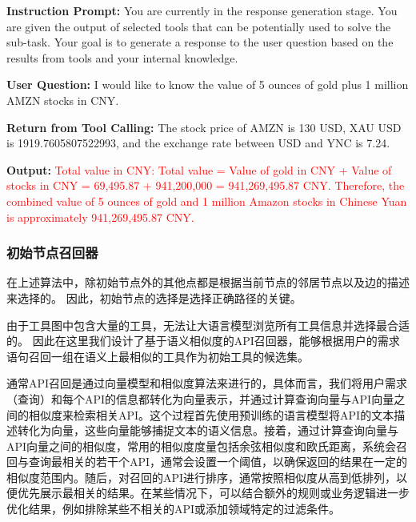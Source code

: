 \begin{center}
\begin{tcolorbox}[colback=bgcolor, colframe=black, width=0.8\textwidth, boxrule=0.5mm, 
coltitle=white, colbacktitle=titlecolor, title=An Example for Response Generation with GPT-4]


\textbf{Instruction Prompt:} You are currently in the response generation stage. You are given the output of selected tools that can be potentially used to solve the sub-task. Your goal is to generate a response to the user question based on the results from tools and your internal knowledge.

\textbf{User Question:} I would like to know the value of 5 ounces of gold plus 1 million AMZN stocks in CNY.

\textbf{Return from Tool Calling:} The stock price of AMZN is 130 USD, XAU USD is 1919.7605807522993, and the exchange rate between USD and YNC is 7.24.

\textbf{Output:} \textcolor{red}{Total value in CNY: Total value = Value of gold in CNY + Value of stocks in CNY = 69,495.87 + 941,200,000 = 941,269,495.87 CNY. Therefore, the combined value of 5 ounces of gold and 1 million Amazon stocks in Chinese Yuan is approximately 941,269,495.87 CNY.}

\end{tcolorbox}

\end{center}

\subsubsection{初始节点召回器}

在上述算法中，除初始节点外的其他点都是根据当前节点的邻居节点以及边的描述来选择的。
因此，初始节点的选择是选择正确路径的关键。

由于工具图中包含大量的工具，无法让大语言模型浏览所有工具信息并选择最合适的。
因此在这里我们设计了基于语义相似度的API召回器，能够根据用户的需求语句召回一组在语义上最相似的工具作为初始工具的候选集。

通常API召回是通过向量模型和相似度算法来进行的，具体而言，我们将用户需求（查询）和每个API的信息都转化为向量表示，并通过计算查询向量与API向量之间的相似度来检索相关API。这个过程首先使用预训练的语言模型将API的文本描述转化为向量，这些向量能够捕捉文本的语义信息。接着，通过计算查询向量与API向量之间的相似度，常用的相似度度量包括余弦相似度和欧氏距离，系统会召回与查询最相关的若干个API，通常会设置一个阈值，以确保返回的结果在一定的相似度范围内。随后，对召回的API进行排序，通常按照相似度从高到低排列，以便优先展示最相关的结果。在某些情况下，可以结合额外的规则或业务逻辑进一步优化结果，例如排除某些不相关的API或添加领域特定的过滤条件。

